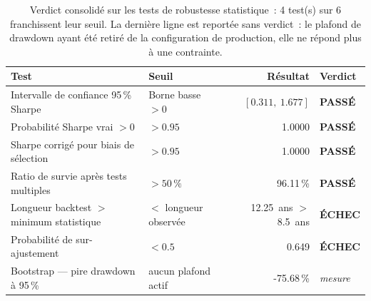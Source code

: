 \begin{table}[H]
\centering
\caption{Verdict consolidé sur les tests de robustesse statistique~: 4 test(s) sur 6 franchissent leur seuil. La dernière ligne est reportée sans verdict~: le plafond de drawdown ayant été retiré de la configuration de production, elle ne répond plus à une contrainte.}
\label{tab:robustness_verdict_summary}
\begin{tabular}{llrl}
\toprule
Test & Seuil & Résultat & Verdict \\
\midrule
Intervalle de confiance 95\,\% Sharpe & Borne basse $> 0$ & $[0.311,\ 1.677]$ & \textcolor{rsiGreen}{\textbf{PASSÉ}} \\
Probabilité Sharpe vrai $> 0$ & $> 0.95$ & 1.0000 & \textcolor{rsiGreen}{\textbf{PASSÉ}} \\
Sharpe corrigé pour biais de sélection & $> 0.95$ & 1.0000 & \textcolor{rsiGreen}{\textbf{PASSÉ}} \\
Ratio de survie après tests multiples & $> 50\,\%$ & 96.11\,\% & \textcolor{rsiGreen}{\textbf{PASSÉ}} \\
Longueur backtest $>$ minimum statistique & $<$ longueur observée & 12.25~ans $>$ 8.5~ans & \textcolor{tsOrange}{\textbf{ÉCHEC}} \\
Probabilité de sur-ajustement & $< 0.5$ & 0.649 & \textcolor{tsOrange}{\textbf{ÉCHEC}} \\
Bootstrap --- pire drawdown à 95\,\% & aucun plafond actif & -75.68\,\% & \emph{mesure} \\
\bottomrule
\end{tabular}
\end{table}

